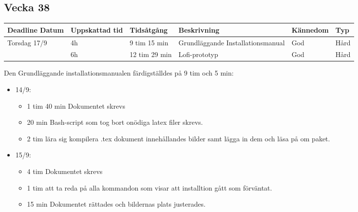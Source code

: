 \documentclass{TDP003mall}
\begin{document}
\subsection{Vecka 38}
\begin{tabularx}{\linewidth}{|l|l|l|X|l|l|}
	\hline
	Deadline Datum & Uppskattad tid & Tidsåtgång    & Beskrivning                       & Kännedom & Typ  \\ [0.5ex]
	\hline
	Torsdag 17/9   & 4h             & 9 tim 15 min  & Grundläggande Installationsmanual & God      & Hård \\
	\hline
                   & 6h             & 12 tim 29 min & Lofi-prototyp                     & God      & Hård \\
	\hline
\end{tabularx}

Den Grundläggande installationsmanualen färdigställdes på 9 tim och 5 min:
\begin{itemize}
	\item 14/9:
	\begin{itemize}
		\item 1 tim 40 min Dokumentet skrevs
		\item 20 min Bash-script som tog bort onödiga latex filer skrevs.
		\item 2 tim lära sig kompilera .tex dokument innehållandes bilder samt lägga in dem och läsa på om paket.
	\end{itemize}
	\item 15/9:
	\begin{itemize}
		\item 4 tim Dokumentet skrevs
		\item 1 tim att ta reda på alla kommandon som visar att installtion gått som förväntat.
		\item 15 min Dokumentet rättades och bildernas plats justerades.\\
	\end{itemize}
\end{itemize}
\end{document}
